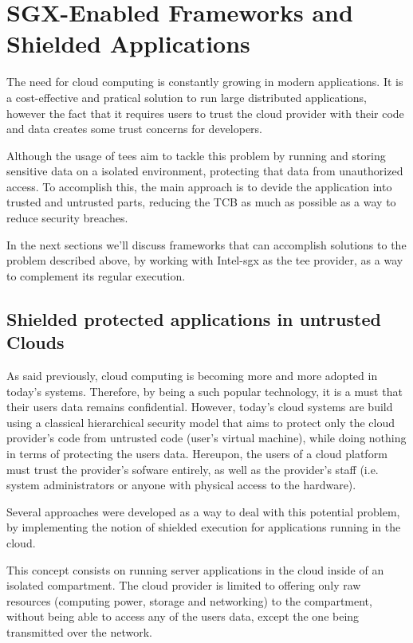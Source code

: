 

\section{SGX-Enabled Frameworks and Shielded Applications}

The need for cloud computing is constantly growing in modern applications. 
It is a cost-effective and pratical solution to run large distributed applications, however the fact that it requires users to trust the cloud provider with their code and data creates some trust concerns for developers.

Although the usage of \gls{tee}s aim to tackle this problem by running and storing sensitive data on a isolated environment, protecting that data from unauthorized access. To accomplish this, the main approach is to devide the application into trusted and untrusted parts, reducing the TCB as much as possible as a way to reduce security breaches. 

In the next sections we'll discuss frameworks that can accomplish solutions to the problem described above, by working with Intel-\gls{sgx} as the \gls{tee} provider, as a way to complement its regular execution.


\subsection{Shielded protected applications in untrusted Clouds}

As said previously, cloud computing is becoming more and more adopted in today's systems. 
Therefore, by being a such popular technology, it is a must that their users data remains confidential. 
However, today's cloud systems are build using a classical hierarchical security model that aims to protect only the cloud provider's code from untrusted code (user's virtual machine), while doing nothing in terms of protecting the users data. 
Hereupon, the users of a cloud platform must trust the provider's sofware entirely, as well as the provider's staff (i.e. system administrators or anyone with physical access to the hardware).

Several approaches were developed as a way to deal with this potential problem, by implementing the notion of shielded execution for applications running in the cloud. 

This concept consists on running server applications in the cloud inside of an isolated compartment. The cloud provider is limited to offering only raw resources (computing power, storage and networking) to the compartment, without being able to access any of the users data, except the one being transmitted over the network. 

